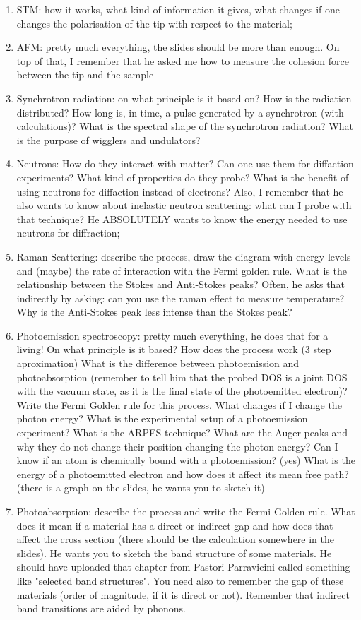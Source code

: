 \documentclass[../main.tex]{subfiles}
\begin{document}
\begin{enumerate}
    \item STM: how it works, what kind of information it gives, what changes if one changes the polarisation of the tip with respect to the material;
    \item AFM: pretty much everything, the slides should be more than enough. On top of that, I remember that he asked me how to measure the cohesion force between the tip and the sample
    \item Synchrotron radiation: on what principle is it based on? How is the radiation distributed? How long is, in time, a pulse generated by a synchrotron (with calculations)? What is the spectral shape of the synchrotron radiation? What is the purpose of wigglers and undulators?
    \item Neutrons: How do they interact with matter? Can one use them for diffaction experiments? What kind of properties do they probe? What is the benefit of using neutrons for diffaction instead of electrons? Also, I remember that he also wants to know about inelastic neutron scattering: what can I probe with that technique? He ABSOLUTELY wants to know the energy needed to use neutrons for diffraction;
    \item Raman Scattering: describe the process, draw the diagram with energy levels and (maybe) the rate of interaction with the Fermi golden rule. What is the relationship between the Stokes and Anti-Stokes peaks? Often, he asks that indirectly by asking: can you use the raman effect to measure temperature? Why is the Anti-Stokes peak less intense than the Stokes peak?
    \item Photoemission spectroscopy: pretty much everything, he does that for a living! On what principle is it based? How does the process work (3 step aproximation) What is the difference between photoemission and photoabsorption (remember to tell him that the probed DOS is a joint DOS with the vacuum state, as it is the final state of the photoemitted electron)? Write the Fermi Golden rule for this process. What changes if I change the photon energy? What is the experimental setup of a photoemission experiment? What is the ARPES technique? What are the Auger peaks and why they do not change their position changing the photon energy? Can I know if an atom is chemically bound with a photoemission? (yes) What is the energy of a photoemitted electron and how does it affect its mean free path?(there is a graph on the slides, he wants you to sketch it)
    \item Photoabsorption: describe the process and write the Fermi Golden rule. What does it mean if a material has a direct or indirect gap and how does that affect the cross section (there should be the calculation somewhere in the slides). He wants you to sketch the band structure of some materials. He should have uploaded that chapter from Pastori Parravicini called something like "selected band structures". You need also to remember the gap of these materials (order of magnitude, if it is direct or not). Remember that indirect band transitions are aided by phonons.

\end{enumerate}
\end{document}
